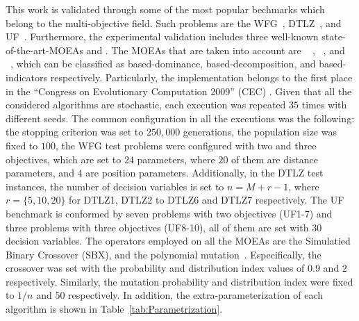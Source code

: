This work is validated through some of the most popular bechmarks which belong to the multi-objective field.
%
Such problems are the WFG~\cite{Joel:WFG}, DTLZ~\cite{Joel:DTLZ}, and UF~\cite{Joel:CEC2009}.
%
Furthermore, the experimental validation includes three well-known state-of-the-art-MOEAs and \VSDMOEA{}.
%
The MOEAs that are taken into account are \NSGAII{}~\cite{Joel:jMetal} , \MOEAD{}~\cite{MOEADCode}, and \RMOEA{}~\cite{R2EMOACode}, which can be classified as based-dominance, based-decomposition, and based-indicators respectively.
%
Particularly, the \MOEAD{} implementation belongs to the first place in the ``Congress on Evolutionary Computation 2009'' (CEC) \cite{zhang2009performance}.
%
Given that all the considered algorithms are stochastic, each execution was repeated $35$ times with different seeds.
%
The common configuration in all the executions was the following: the stopping criterion was set to $250,000$ generations, the population size was fixed to $100$, the WFG test problems were configured with two and three objectives, which are set to $24$ parameters, where $20$ of them are distance parameters, and $4$ are position parameters.
%
Additionally, in the DTLZ test instances, the number of decision variables is set to $n=M+r-1$, where $r=\{5, 10, 20\}$ for DTLZ1, DTLZ2 to DTLZ6 and DTLZ7 respectively.
% 
The UF benchmark is conformed by seven problems with two objectives (UF1-7) and three problems with three objectives (UF8-10), all of them are set with $30$ decision variables.
%
The operators employed on all the MOEAs are the Simulatied Binary Crossover (SBX), and the polynomial mutation~\cite{Joel:SBX1994, Joel:Mutation}.
%
Especifically, the crossover was set with the probability and distribution index values of $0.9$ and $2$ respectively.
%
Similarly, the mutation probability and distribution index were fixed to $1/n$ and $50$ respectively.
%
%
%
%
%
In addition, the extra-parameterization of each algorithm is shown in Table~\ref{tab:Parametrization}.


